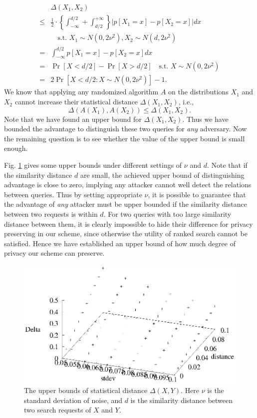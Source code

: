 \documentclass{IEEEtran}
\begin{document}
$$\begin{aligned}
&\Delta(X_1, X_2) \\
\leq& \frac{1}{2}\cdot\left\{ \int_{-\infty}^{d/2} + \int_{d/2}^{+\infty} \right\} \bigg|p[X_1 = x] - p[X_2 = x]\bigg|dx \\
&\quad \textrm{s.t. } X_1\sim N(0,2\nu^2), X_2\sim N(d,2\nu^2)\\
=& \int_{-\infty}^{d/2} p[X_1 = x] - p[X_2 = x] dx \\
=& \Pr[X<d/2] - \Pr[X>d/2] \quad \textrm{s.t. } X\sim N(0,2\nu^2) \\
=& 2\Pr[X<d/2: X\sim N(0,2\nu^2)]-1.
\end{aligned}$$
We know that applying any randomized algorithm $A$ on the distributions $X_1$ and $X_2$ cannot increase their statistical distance $\Delta(X_1, X_2)$, i.e., 
$$\Delta(A(X_1), A(X_2)) \leq \Delta(X_1, X_2).$$ 
Note that we have found an upper bound for $\Delta(X_1, X_2)$. Thus we have bounded the advantage to distinguish these two queries for \emph{any} adversary. Now the remaining question is to see whether the value of the upper bound is small enough.

Fig. \ref{fig:diff_factors} gives some upper bounds under different settings of $\nu$ and $d$. Note that if the similarity distance $d$ are small, the achieved upper bound of distinguishing advantage is close to zero, implying any attacker cannot well detect the relations between queries. Thus by setting appropriate $\nu$, it is possible to guarantee that the advantage of \emph{any} attacker must be upper bounded if the similarity distance between two requests is within $d$. For two queries with too large similarity distance between them, it is clearly impossible to hide their difference for privacy preserving in our scheme, since otherwise the utility of ranked search cannot be satisfied.
Hence we have established an upper bound of how much degree of privacy our scheme can preserve.

\begin{figure}
\centering
\includegraphics[width=0.8\linewidth]{stdev1samples.eps}
\caption{The upper bounds of statistical distance $\Delta(X, Y)$. Here $\nu$ is the standard deviation of noise, and $d$ is the similarity distance between two search requests of $X$ and $Y$.}
\label{fig:diff_factors}
\end{figure}



\end{document}
